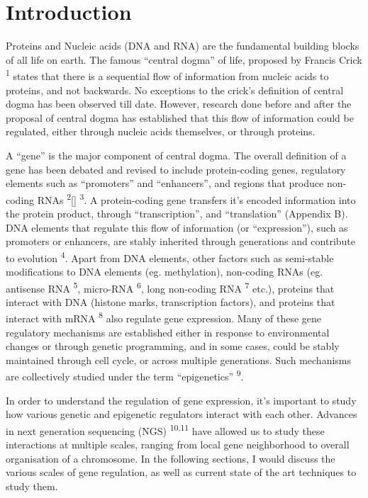 \documentclass[11pt,twoside]{MPIthesis}
\theoremstyle{definition}
\theoremstyle{definition}
\theoremstyle{definition}
\theoremstyle{remark}
\begin{document}

%
\mainmatter %
\pagestyle{fancyplain} %

\chapter{Introduction}\label{introduction}

Proteins and Nucleic acids (DNA and RNA) are the fundamental building
blocks of all life on earth. The famous ``central dogma'' of life,
proposed by Francis Crick \textsuperscript{1} states that there is a
sequential flow of information from nucleic acids to proteins, and not
backwards. No exceptions to the crick's definition of central dogma has
been observed till date. However, research done before and after the
proposal of central dogma has established that this flow of information
could be regulated, either through nucleic acids themselves, or through
proteins.

A ``gene'' is the major component of central dogma. The overall
definition of a gene has been debated and revised to include
protein-coding genes, regulatory elements such as ``promoters'' and
``enhancers'', and regions that produce non-coding RNAs
\textsuperscript{2}{[}{]} \textsuperscript{3}. A protein-coding gene
transfers it's encoded information into the protein product, through
``transcription'', and ``translation'' (Appendix B). DNA elements that
regulate this flow of information (or ``expression''), such as promoters
or enhancers, are stably inherited through generations and contribute to
evolution \textsuperscript{4}. Apart from DNA elements, other factors
such as semi-stable modifications to DNA elements (eg. methylation),
non-coding RNAs (eg. antisense RNA \textsuperscript{5}, micro-RNA
\textsuperscript{6}, long non-coding RNA \textsuperscript{7} etc.),
proteins that interact with DNA (histone marks, transcription factors),
and proteins that interact with mRNA \textsuperscript{8} also regulate
gene expression. Many of these gene regulatory mechanisms are
established either in response to environmental changes or through
genetic programming, and in some cases, could be stably maintained
through cell cycle, or across multiple generations. Such mechanisms are
collectively studied under the term ``epigenetics'' \textsuperscript{9}.

In order to understand the regulation of gene expression, it's important
to study how various genetic and epigenetic regulators interact with
each other. Advances in next generation sequencing (NGS)
\textsuperscript{10,11} have allowed us to study these interactions at
multiple scales, ranging from local gene neighborhood to overall
organisation of a chromosome. In the following sections, I would discuss
the various scales of gene regulation, as well as current state of the
art techniques to study them.
\end{document}
